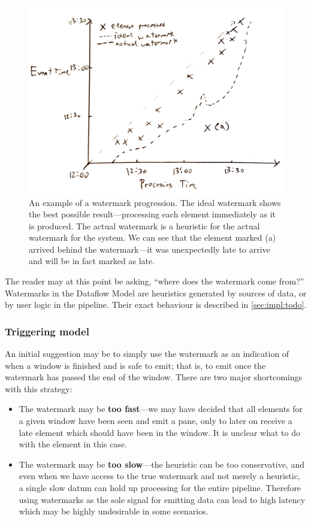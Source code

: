 \begin{figure}[h]
	\includegraphics[width=\textwidth]{images/temp/watermark-progression-example}
	\caption{An example of a watermark progression. The ideal watermark shows the best possible result---processing each element immediately as it is produced. The actual watermark is a heuristic for the actual watermark for the system. We can see that the element marked (a) arrived behind the watermark---it was unexpectedly late to arrive and will be in fact marked as late.}
	\label{fig:prep:watermark-progression}
\end{figure}

The reader may at this point be asking, ``where does the watermark come from?''
Watermarks in the Dataflow Model are heuristics generated by sources of data, or by user logic in the pipeline.
Their exact behaviour is described in \cref{sec:impl:todo}.

\subsubsection{Triggering model}

An initial suggestion may be to simply use the watermark as an indication of when a window is finished and is safe to emit; that is, to emit once the watermark has passed the end of the window.
There are two major shortcomings with this strategy:
\begin{itemize}
	\item The watermark may be \textbf{too fast}---we may have decided that all elements for a given window have been seen and emit a pane, only to later on receive a late element which should have been in the window.
	It is unclear what to do with the element in this case.
	
	\item The watermark may be \textbf{too slow}---the heuristic can be too conservative, and even when we have access to the true watermark and not merely a heuristic, a single slow datum can hold up processing for the entire pipeline.
	Therefore using watermarks as the sole signal for emitting data can lead to high latency which may be highly undesirable in some scenarios.
\end{itemize} 

